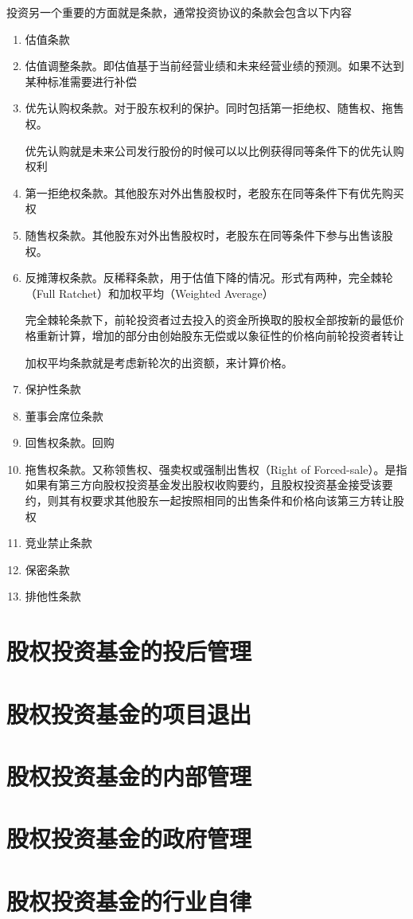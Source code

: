 \documentclass[UTF8,12pt]{ctexbook}
\numberwithin{equation}{section} %
\numberwithin{figure}{section}
\numberwithin{table}{section}
\begin{document}
	投资另一个重要的方面就是条款，通常投资协议的条款会包含以下内容
	\begin{enumerate}
		\item 估值条款
		
		\item 估值调整条款。即估值基于当前经营业绩和未来经营业绩的预测。如果不达到某种标准需要进行补偿
		
		\item 优先认购权条款。对于股东权利的保护。同时包括第一拒绝权、随售权、拖售权。
		
		优先认购就是未来公司发行股份的时候可以以比例获得同等条件下的优先认购权利
		
		\item 第一拒绝权条款。其他股东对外出售股权时，老股东在同等条件下有优先购买权
		
		\item 随售权条款。其他股东对外出售股权时，老股东在同等条件下参与出售该股权。
		
		\item 反摊薄权条款。反稀释条款，用于估值下降的情况。形式有两种，完全棘轮（Full Ratchet）和加权平均（Weighted Average）
		
		完全棘轮条款下，前轮投资者过去投入的资金所换取的股权全部按新的最低价格重新计算，增加的部分由创始股东无偿或以象征性的价格向前轮投资者转让
		
		加权平均条款就是考虑新轮次的出资额，来计算价格。
		
		\item 保护性条款
		
		\item 董事会席位条款
		
		\item 回售权条款。回购
		
		\item 拖售权条款。又称领售权、强卖权或强制出售权（Right of Forced-sale）。是指如果有第三方向股权投资基金发出股权收购要约，且股权投资基金接受该要约，则其有权要求其他股东一起按照相同的出售条件和价格向该第三方转让股权
		
		\item 竞业禁止条款
		
		\item 保密条款
		
		\item 排他性条款
	\end{enumerate}
	
	\section{股权投资基金的投后管理}
	
	\section{股权投资基金的项目退出}
	
	\section{股权投资基金的内部管理}
	
	\section{股权投资基金的政府管理}
	
	\section{股权投资基金的行业自律}
	
	
	
	
\end{document}
